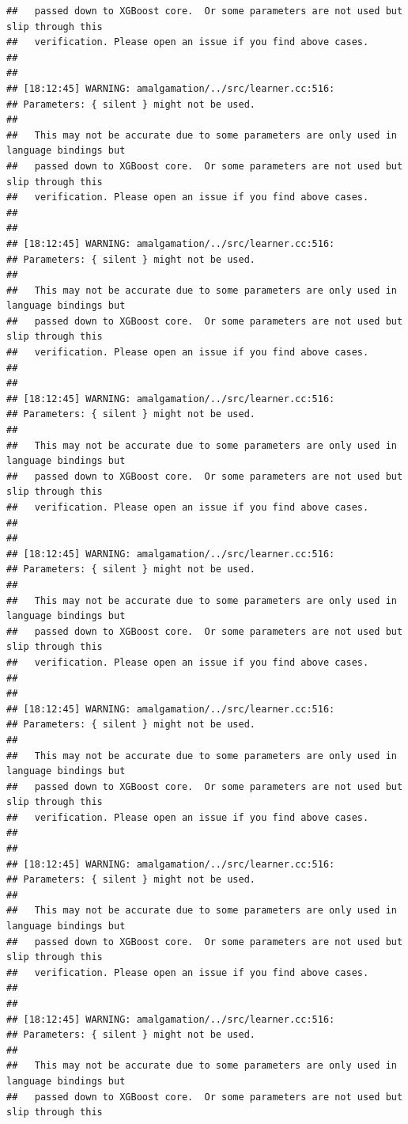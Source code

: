 \documentclass[AMS,STIX2COL]{WileyNJD-v2}\usepackage[]{graphicx}\usepackage[]{color}
\makeatletter
\newenvironment{kframe}{%
 \def\at@end@of@kframe{}%
 \ifinner\ifhmode%
  \def\at@end@of@kframe{\end{minipage}}%
  \begin{minipage}{\columnwidth}%
 \fi\fi%
 \def\FrameCommand##1{\hskip\@totalleftmargin \hskip-\fboxsep
 \colorbox{shadecolor}{##1}\hskip-\fboxsep
     \hskip-\linewidth \hskip-\@totalleftmargin \hskip\columnwidth}%
 \MakeFramed {\advance\hsize-\width
   \@totalleftmargin\z@ \linewidth\hsize
   \@setminipage}}%
 {\par\unskip\endMakeFramed%
 \at@end@of@kframe}
\newenvironment{knitrout}{}{} %
\makeatother
\begin{document}
\begin{knitrout}
\begin{kframe}
\begin{verbatim}
##   passed down to XGBoost core.  Or some parameters are not used but slip through this
##   verification. Please open an issue if you find above cases.
## 
## 
## [18:12:45] WARNING: amalgamation/../src/learner.cc:516: 
## Parameters: { silent } might not be used.
## 
##   This may not be accurate due to some parameters are only used in language bindings but
##   passed down to XGBoost core.  Or some parameters are not used but slip through this
##   verification. Please open an issue if you find above cases.
## 
## 
## [18:12:45] WARNING: amalgamation/../src/learner.cc:516: 
## Parameters: { silent } might not be used.
## 
##   This may not be accurate due to some parameters are only used in language bindings but
##   passed down to XGBoost core.  Or some parameters are not used but slip through this
##   verification. Please open an issue if you find above cases.
## 
## 
## [18:12:45] WARNING: amalgamation/../src/learner.cc:516: 
## Parameters: { silent } might not be used.
## 
##   This may not be accurate due to some parameters are only used in language bindings but
##   passed down to XGBoost core.  Or some parameters are not used but slip through this
##   verification. Please open an issue if you find above cases.
## 
## 
## [18:12:45] WARNING: amalgamation/../src/learner.cc:516: 
## Parameters: { silent } might not be used.
## 
##   This may not be accurate due to some parameters are only used in language bindings but
##   passed down to XGBoost core.  Or some parameters are not used but slip through this
##   verification. Please open an issue if you find above cases.
## 
## 
## [18:12:45] WARNING: amalgamation/../src/learner.cc:516: 
## Parameters: { silent } might not be used.
## 
##   This may not be accurate due to some parameters are only used in language bindings but
##   passed down to XGBoost core.  Or some parameters are not used but slip through this
##   verification. Please open an issue if you find above cases.
## 
## 
## [18:12:45] WARNING: amalgamation/../src/learner.cc:516: 
## Parameters: { silent } might not be used.
## 
##   This may not be accurate due to some parameters are only used in language bindings but
##   passed down to XGBoost core.  Or some parameters are not used but slip through this
##   verification. Please open an issue if you find above cases.
## 
## 
## [18:12:45] WARNING: amalgamation/../src/learner.cc:516: 
## Parameters: { silent } might not be used.
## 
##   This may not be accurate due to some parameters are only used in language bindings but
##   passed down to XGBoost core.  Or some parameters are not used but slip through this

\end{verbatim}
\end{kframe}
\end{knitrout}
\end{document}

